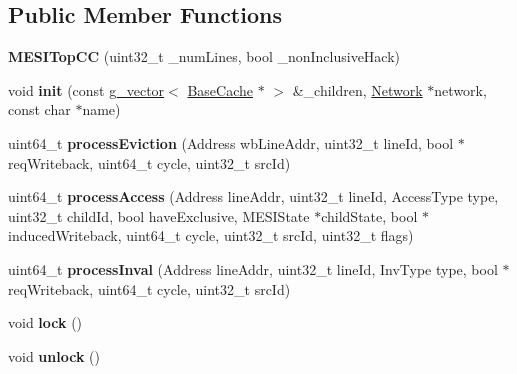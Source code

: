 \subsection*{Public Member Functions}
\begin{DoxyCompactItemize}
\item 
\hypertarget{classMESITopCC_a0302722a6c769131461710395c808d6f}{{\bfseries M\-E\-S\-I\-Top\-C\-C} (uint32\-\_\-t \-\_\-num\-Lines, bool \-\_\-non\-Inclusive\-Hack)}\label{classMESITopCC_a0302722a6c769131461710395c808d6f}

\item 
\hypertarget{classMESITopCC_a1d0b9de1944d94b1c4a738f1bb826087}{void {\bfseries init} (const \hyperlink{classg__vector}{g\-\_\-vector}$<$ \hyperlink{classBaseCache}{Base\-Cache} $\ast$ $>$ \&\-\_\-children, \hyperlink{classNetwork}{Network} $\ast$network, const char $\ast$name)}\label{classMESITopCC_a1d0b9de1944d94b1c4a738f1bb826087}

\item 
\hypertarget{classMESITopCC_aa44dfd0280f94f9339fcaf8dc0e20269}{uint64\-\_\-t {\bfseries process\-Eviction} (Address wb\-Line\-Addr, uint32\-\_\-t line\-Id, bool $\ast$req\-Writeback, uint64\-\_\-t cycle, uint32\-\_\-t src\-Id)}\label{classMESITopCC_aa44dfd0280f94f9339fcaf8dc0e20269}

\item 
\hypertarget{classMESITopCC_aed318f9fff1699380161f8635fefc791}{uint64\-\_\-t {\bfseries process\-Access} (Address line\-Addr, uint32\-\_\-t line\-Id, Access\-Type type, uint32\-\_\-t child\-Id, bool have\-Exclusive, M\-E\-S\-I\-State $\ast$child\-State, bool $\ast$induced\-Writeback, uint64\-\_\-t cycle, uint32\-\_\-t src\-Id, uint32\-\_\-t flags)}\label{classMESITopCC_aed318f9fff1699380161f8635fefc791}

\item 
\hypertarget{classMESITopCC_a6eb7b6c5e4942218526507909627b260}{uint64\-\_\-t {\bfseries process\-Inval} (Address line\-Addr, uint32\-\_\-t line\-Id, Inv\-Type type, bool $\ast$req\-Writeback, uint64\-\_\-t cycle, uint32\-\_\-t src\-Id)}\label{classMESITopCC_a6eb7b6c5e4942218526507909627b260}

\item 
\hypertarget{classMESITopCC_a8cb3d0e20bc11cb818c0e179c9f31a4c}{void {\bfseries lock} ()}\label{classMESITopCC_a8cb3d0e20bc11cb818c0e179c9f31a4c}

\item 
\hypertarget{classMESITopCC_a24cc9111c6f1b6afa6ec60ba9005a42a}{void {\bfseries unlock} ()}\label{classMESITopCC_a24cc9111c6f1b6afa6ec60ba9005a42a}


\end{DoxyCompactItemize}
